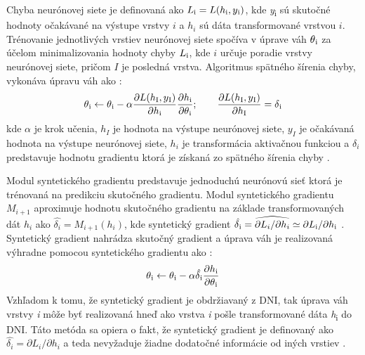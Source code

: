 Chyba neurónovej siete je definovaná ako $L\textsubscript{i}=L(h\textsubscript{i},y\textsubscript{i})$, kde \textit{y}\textsubscript{i} sú skutočné hodnoty očakávané na výstupe vrstvy $i$ a $h_i$ sú dáta transformované vrstvou $i$. Trénovanie jednotlivých vrstiev neurónovej siete spočíva v úprave váh $\theta\textsubscript{i}$ za účelom minimalizovania hodnoty chyby $L\textsubscript{i}$, kde $i$ určuje poradie vrstvy neurónovej siete, pričom $I$ je posledná vrstva. Algoritmus spätného šírenia chyby, vykonáva úpravu váh ako \cite{Jaderberg2016, Goh1995}:
\begin{equation}
    \theta\textsubscript{i} \leftarrow \theta\textsubscript{i} - \alpha \frac{\partial L (h\textsubscript{I},y\textsubscript{I})}{\partial h \textsubscript{i}}\frac{\partial h \textsubscript{i}}{\partial \theta \textsubscript{i}} ;\qquad \frac{\partial L(h\textsubscript{I},y\textsubscript{I})}{\partial h \textsubscript{I}} = \delta\textsubscript{i}
\end{equation}
kde $\alpha$ je krok učenia, $h_I$ je hodnota na výstupe neurónovej siete, $y_I$ je očakávaná hodnota na výstupe neurónovej siete, $h_i$ je transformácia aktivačnou funkciou a $\delta_i$ predstavuje hodnotu gradientu ktorá je získaná zo spätného šírenia chyby \cite{Czarnecki2017, Goh1995, Jaderberg2016}.

 
 Modul syntetického gradientu predstavuje jednoduchú neurónovú sieť ktorá je trénovaná na predikciu skutočného gradientu. Modul syntetického gradientu $M_{i+1}$ aproximuje hodnotu skutočného gradientu na základe transformovaných dát $h_i$ ako $\hat{\delta_i}=M_{i+1}(h_i)$, kde syntetický gradient $\hat{\delta\textsubscript{i}} = \widehat{\partial L_i/\partial h_i}\simeq\partial L\textsubscript{i}/\partial h \textsubscript{i}$ \cite{Czarnecki2017}. Syntetický gradient nahrádza skutočný gradient a úprava váh je realizovaná výhradne pomocou syntetického gradientu ako \cite{Jaderberg2016}:
\begin{equation}
    \theta\textsubscript{i} \leftarrow \theta\textsubscript{i} - \alpha \hat{\delta\textsubscript{i}}\frac{\partial h \textsubscript{i}}{\partial \theta \textsubscript{i}}
\end{equation}
Vzhľadom k tomu, že syntetický gradient je obdržiavaný z DNI, tak úprava váh vrstvy \textit{i} môže byť realizovaná hneď ako vrstva \textit{i} pošle transformované dáta \textit{h}\textsubscript{i} do DNI. Táto metóda sa opiera o fakt, že syntetický gradient je definovaný ako $\hat{\delta_i} = \partial L_i / \partial h_i$ a teda nevyžaduje žiadne dodatočné informácie od iných vrstiev \cite{Czarnecki2017}.

